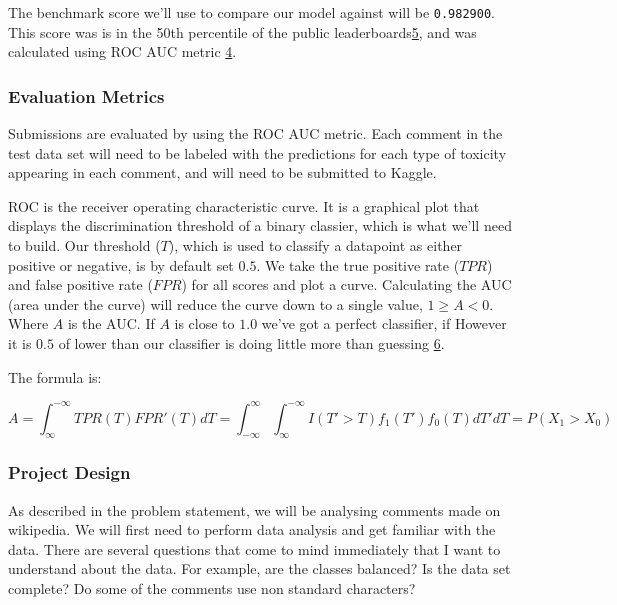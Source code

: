 The benchmark score we'll use to compare our model against will be
\texttt{0.982900}. This score was is in the 50th percentile of the
public
leaderboards\href{https://www.kaggle.com/c/8076/publicleaderboarddata.zip}{5},
and was calculated using ROC AUC metric
\href{http://scikit-learn.org/stable/modules/generated/sklearn.metrics.roc_auc_score.html}{4}.

\hypertarget{evaluation-metrics}{%
\subsubsection{Evaluation Metrics}\label{evaluation-metrics}}

Submissions are evaluated by using the ROC AUC metric. Each comment in
the test data set will need to be labeled with the predictions for each
type of toxicity appearing in each comment, and will need to be
submitted to Kaggle.

ROC is the receiver operating characteristic curve. It is a graphical
plot that displays the discrimination threshold of a binary classier,
which is what we'll need to build. Our threshold (\(T\)), which is used
to classify a datapoint as either positive or negative, is by default
set \(0.5\). We take the true positive rate (\(TPR\)) and false positive
rate (\(FPR\)) for all scores and plot a curve. Calculating the AUC
(area under the curve) will reduce the curve down to a single value,
\(1 \ge A < 0\). Where \(A\) is the AUC. If \(A\) is close to \(1.0\)
we've got a perfect classifier, if However it is \(0.5\) of lower than
our classifier is doing little more than guessing
\href{https://en.wikipedia.org/wiki/Receiver_operating_characteristic\#Area_under_the_curve}{6}.

The formula is:

\[
A = \int_{\infty}^{-\infty} TPR(T)FPR'(T)dT = \int_{-\infty}^{\infty}\int_{\infty}^{-\infty}I(T' > T)f_1(T')f_0(T)dT'dT = P(X_1 >X_0)
\]

\hypertarget{project-design}{%
\subsubsection{Project Design}\label{project-design}}

As described in the problem statement, we will be analysing comments
made on wikipedia. We will first need to perform data analysis and get
familiar with the data. There are several questions that come to mind
immediately that I want to understand about the data. For example, are
the classes balanced? Is the data set complete? Do some of the comments
use non standard characters?

